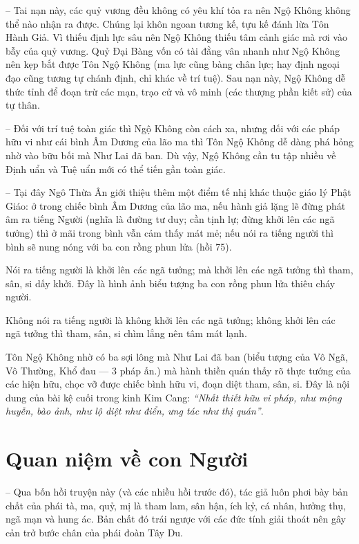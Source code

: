 -- Tai nạn này, các quỷ vương đều không có yêu khí tỏa ra nên Ngộ Không không thể nào nhận ra được. Chúng lại khôn ngoan tương kế, tựu kế đánh lừa Tôn Hành Giả. Vì thiếu định lực sâu nên Ngộ Không thiếu tâm cảnh giác mà rơi vào bẫy của quỷ vương. Quỷ Đại Bàng vốn có tài đằng vân nhanh như Ngộ Không nên kẹp bắt được Tôn Ngộ Không (ma lực cũng bàng chân lực; hay định ngoại đạo cũng tương tự chánh định, chỉ khác về trí tuệ). Sau nạn này, Ngộ Không dễ thức tỉnh để đoạn trừ các mạn, trạo cử và vô minh (các thượng phần kiết sử) của tự thân.

-- Đối với trí tuệ toàn giác thì Ngộ Không còn cách xa, nhưng đối với các pháp hữu vi như cái bình Âm Dương của lão ma thì Tôn Ngộ Không dễ dàng phá hỏng nhờ vào bữu bối mà Như Lai đã ban. Dù vậy, Ngộ Không cần tu tập nhiều về Định uẩn và Tuệ uẩn mới có thể tiến gần toàn giác.

-- Tại đây Ngô Thừa Ân giới thiệu thêm một điểm tế nhị khác thuộc giáo lý Phật Giáo: ở trong chiếc bình Âm Dương của lão ma, nếu hành giả lặng lẽ đừng phát âm ra tiếng Người (nghĩa là đường tư duy; cần tịnh lự; đừng khởi lên các ngã tưởng) thì ở mãi trong bình vẫn cảm thấy mát mẻ; nếu nói ra tiếng người thì bình sẽ nung nóng với ba con rồng phun lửa (hồi 75).

Nói ra tiếng người là khởi lên các ngã tưởng; mà khởi lên các ngã tưởng thì tham, sân, si dấy khởi. Đây là hình ảnh biểu tượng ba con rồng phun lửa thiêu cháy người.

Không nói ra tiếng người là không khởi lên các ngã tưởng; không khởi lên các ngã tưởng thì tham, sân, si chìm lắng nên tâm mát lạnh.

Tôn Ngộ Không nhờ có ba sợi lông mà Như Lai đã ban (biểu tượng của Vô Ngã, Vô Thường, Khổ đau --- 3 pháp ấn.) mà hành thiền quán thấy rõ thực tướng của các hiện hữu, chọc vỡ được chiếc bình hữu vi, đoạn diệt tham, sân, si. Đây là nội dung của bài kệ cuối trong kinh Kim Cang: \emph{``Nhất thiết hữu vi pháp, như mộng huyễn, bào ảnh, như lộ diệt như điển, ưng tác như thị quán''}.

\section{Quan niệm về con Người} %
\label{sec:74_75_con_nguoi}

-- Qua bốn hồi truyện này (và các nhiều hồi trước đó), tác giả luôn phơi bày bản chất của phái tà, ma, quỷ, mị là tham lam, sân hận, ích kỷ, cá nhân, hưởng thụ, ngã mạn và hung ác. Bản chất đó trái ngược với các đức tính giải thoát nên gây cản trở bước chân của phái đoàn Tây Du.


